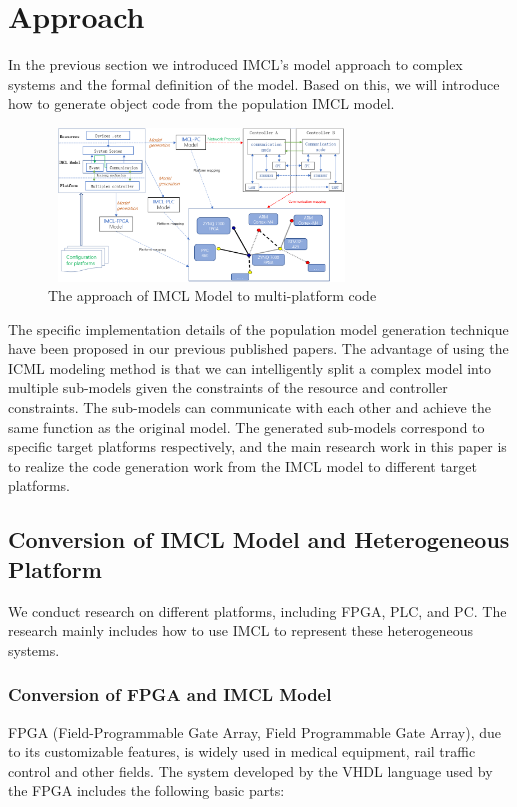 \section{Approach}
In the previous section we introduced IMCL's model approach to complex systems and the formal definition of the model. Based on this, we will introduce how to generate object code from the population IMCL model.

\begin{figure}[!htb]
  \centering
        \includegraphics[height=1.6in, width=3.2in]{approach}
  \caption{The approach of IMCL Model to multi-platform code}\label{approach}
\end{figure}

The specific implementation details of the population model generation technique have been proposed in our previous published papers. The advantage of using the ICML modeling method is that we can intelligently split a complex model into multiple sub-models given the constraints of the resource and controller constraints. The sub-models can communicate with each other and achieve the same function as the original model. The generated sub-models correspond to specific target platforms respectively, and the main research work in this paper is to realize the code generation work from the IMCL model to different target platforms.


\subsection{Conversion of IMCL Model and Heterogeneous Platform}
We conduct research on different platforms, including FPGA, PLC, and PC. The research mainly includes how to use IMCL to represent these heterogeneous systems.

\subsubsection{\textbf{Conversion of FPGA and IMCL Model}}
FPGA (Field-Programmable Gate Array, Field Programmable Gate Array), due to its customizable features, is widely used in medical equipment, rail traffic control and other fields. The system developed by the VHDL language used by the FPGA includes the following basic parts:

